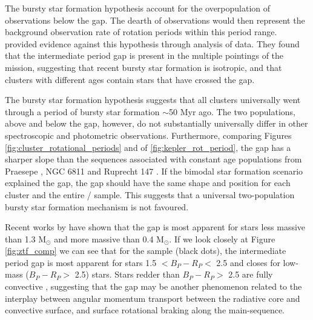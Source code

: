 The bursty star formation hypothesis  account for the overpopulation of observations below the gap. 
The dearth of observations would then represent the background observation rate of rotation periods within this period range.
\citet{gordon_stellar_2021} provided evidence against this hypothesis through analysis of \ktoo{} data.
They found that the intermediate period gap is present in the multiple pointings of the \ktoo{} mission, suggesting that recent bursty star formation is isotropic, and that clusters with different ages contain stars that have crossed the gap.

The bursty star formation hypothesis suggests that all clusters universally went through a period of bursty star formation $\sim$50 Myr ago. 
The two populations, above and below the gap, however, do not substantially universally differ in other spectroscopic and photometric observations.
Furthermore, comparing Figures \ref{fig:cluster_rotational_periods} and of \ref{fig:kepler_rot_period}, the gap has a sharper slope than the sequences associated with constant age populations from Praesepe \citep{douglas_poking_2017,douglas_k2_2019}, NGC 6811 \citep{curtis_temporary_2019} and Ruprecht 147 \citep{curtis_when_2020}. 
If the bimodal star formation scenario explained the gap, the gap should have the same shape and position for each cluster and the entire \ktoo/\kepler{} sample.
This suggests that a universal two-population bursty star formation mechanism is not favoured.

Recent works by \citet{lu_bridging_2022} have shown that the gap is most apparent for stars less massive than 1.3 M$_{\odot}$ and more massive than 0.4 M$_{\odot}$.
If we look closely at Figure \ref{fig:ztf_comp} we can see that for the \ZTF{} sample (black dots), the intermediate period gap is most apparent for stars 1.5 $<B_P-R_P <$ 2.5 and closes for low-mass ($B_P-R_P >$ 2.5) stars.
Stars redder than $B_P-R_P >$ 2.5 are fully convective \citep{amard_first_2019}, suggesting that the gap may be another phenomenon related to the interplay between angular momentum transport between the radiative core and convective surface, and surface rotational braking along the main-sequence.

